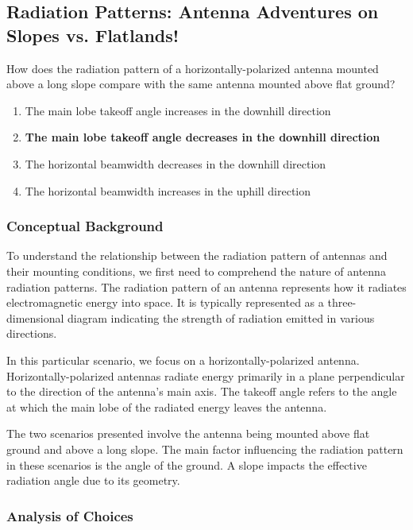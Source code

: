 \subsection{Radiation Patterns: Antenna Adventures on Slopes vs. Flatlands!}

\begin{tcolorbox}[colback=gray!10, colframe=black, title=E9C14] 
How does the radiation pattern of a horizontally-polarized antenna mounted above a long slope compare with the same antenna mounted above flat ground?

\begin{enumerate}[label=\Alph*.]
    \item The main lobe takeoff angle increases in the downhill direction
    \item \textbf{The main lobe takeoff angle decreases in the downhill direction}
    \item The horizontal beamwidth decreases in the downhill direction
    \item The horizontal beamwidth increases in the uphill direction
\end{enumerate} \end{tcolorbox}

\subsubsection{Conceptual Background}

To understand the relationship between the radiation pattern of antennas and their mounting conditions, we first need to comprehend the nature of antenna radiation patterns. The radiation pattern of an antenna represents how it radiates electromagnetic energy into space. It is typically represented as a three-dimensional diagram indicating the strength of radiation emitted in various directions.

In this particular scenario, we focus on a horizontally-polarized antenna. Horizontally-polarized antennas radiate energy primarily in a plane perpendicular to the direction of the antenna's main axis. The takeoff angle refers to the angle at which the main lobe of the radiated energy leaves the antenna.

The two scenarios presented involve the antenna being mounted above flat ground and above a long slope. The main factor influencing the radiation pattern in these scenarios is the angle of the ground. A slope impacts the effective radiation angle due to its geometry.

\subsubsection{Analysis of Choices}

